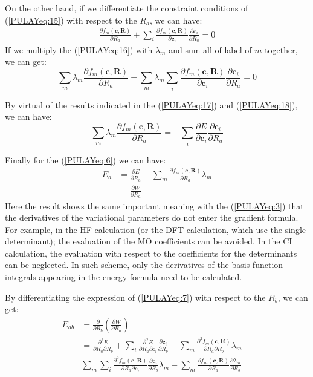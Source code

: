 On the other hand, if we differentiate the constraint conditions of
(\ref{PULAYeq:15}) with respect to the $R_{a}$, we can have:
\begin{align}\label{PULAYeq:16}
  \frac{\partial f_{m}(\bm{c}, \bm{R})}{\partial R_{a}} + \sum_{i}\frac{\partial
    f_{m}(\bm{c}, \bm{R})}{\partial \bm{c}_{i}}\frac{\partial
\bm{c}_{i}}{\partial R_{a}} =
  0
\end{align}
If we multiply the (\ref{PULAYeq:16}) with $\lambda_{m}$ and sum all
of label of $m$ together, we can get:
\begin{equation}\label{PULAYeq:18}
  \sum_{m}\lambda_{m}\frac{\partial f_{m}(\bm{c}, \bm{R})}{\partial R_{a}} +
  \sum_{m}\lambda_{m}\sum_{i}\frac{\partial f_{m}(\bm{c}, \bm{R})}{\partial
    \bm{c}_{i}}\frac{\partial \bm{c}_{i}}{\partial R_{a}} = 0
\end{equation}

By virtual of the results indicated in the (\ref{PULAYeq:17}) and
(\ref{PULAYeq:18}), we can have:
\begin{equation}\label{}
  \sum_{m}\lambda_{m}\frac{\partial f_{m}(\bm{c}, \bm{R})}{\partial R_{a}} = -
  \sum_{i}\frac{\partial E}{\partial \bm{c}_{i}}\frac{\partial
    \bm{c}_{i}}{\partial R_{a}}
\end{equation}

Finally for the (\ref{PULAYeq:6}) we can have:
\begin{align}\label{PULAYeq:7}
  E_{a} &= \frac{\partial E}{\partial R_{a}} - \sum_{m}\frac{\partial
    f_{m}(\bm{c}, \bm{R})}{\partial
    R_{a}}\lambda_{m} \nonumber \\
  &= \frac{\partial W}{\partial R_{a}}
\end{align}
Here the result shows the same important meaning with the
(\ref{PULAYeq:3}) that the derivatives of the variational parameters
do not enter the gradient formula. For example, in the HF calculation
(or the DFT calculation, which use the single determinant); the
evaluation of the MO coefficients can be avoided.  In the CI
calculation, the evaluation with respect to the coefficients for the
determinants can be neglected. In such scheme, only the derivatives of
the basis function integrals appearing in the energy formula need to
be calculated.

By differentiating the expression of (\ref{PULAYeq:7}) with respect to
the $R_{b}$, we can get:
\begin{align}\label{}
  E_{ab} &=\frac{\partial}{\partial R_{b}}\left(\frac{\partial
      W}{\partial
      R_{a}}\right) \nonumber \\
  &=\frac{\partial^{2} E}{\partial R_{a}\partial R_{b}} +
  \sum_{i}\frac{\partial^{2} E}{\partial R_{a}\partial
    \bm{c}_{i}}\frac{\partial \bm{c}_{i}}{\partial R_{b}} -
  \sum_{m}\frac{\partial^{2} f_{m}(\bm{c}, \bm{R})}
  {\partial R_{a}\partial R_{b}}\lambda_{m} - \nonumber \\
  &\sum_{m}\sum_{i}\frac{\partial^{2} f_{m}(\bm{c}, \bm{R})}{\partial
    R_{a}\partial \bm{c}_{i}}\frac{\partial \bm{c}_{i}}{\partial
    R_{b}}\lambda_{m} - \sum_{m}\frac{\partial f_{m}(\bm{c}, \bm{R})}{\partial
    R_{a}}\frac{\partial \lambda_{m}}{\partial R_{b}}
\end{align}

